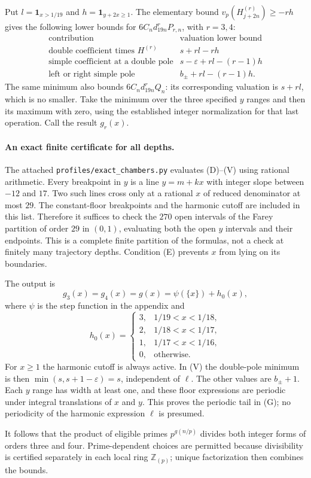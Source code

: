 Put $l=\mathbf1_{x>1/19}$ and $h=\mathbf1_{y+2x\ge1}$. The elementary
bound $v_p(H_{j+2n}^{(r)})\ge-rh$ gives the following lower bounds for
$6C_nd_{19n}^{r}P_{r,n}$, with $r=3,4$:
\[
 \begin{array}{c|c}
 \text{contribution}&\text{valuation lower bound}\\\hline
 \text{double coefficient times }H^{(r)}&s+rl-rh\\
 \text{simple coefficient at a double pole}&s-\varepsilon+rl-(r-1)h\\
 \text{left or right simple pole}&b_\pm+rl-(r-1)h.
 \end{array}
 \tag{V}
\]
The same minimum also bounds $6C_nd_{19n}^rQ_n$: its corresponding
valuation is $s+rl$, which is no smaller. Take the minimum over the three
specified $y$ ranges and then its maximum with zero, using the established
integer normalization for that last operation. Call the result $g_r(x)$.

\paragraph{An exact finite certificate for all depths.}
The attached \texttt{profiles/exact\_chambers.py} evaluates (D)--(V)
using rational arithmetic. Every breakpoint in $y$ is a line $y=m+kx$
with integer slope between $-12$ and $17$. Two such lines cross only at
a rational $x$ of reduced denominator at most $29$. The constant-floor
breakpoints and the harmonic cutoff are included in this list. Therefore
it suffices to check the $270$ open intervals of the Farey partition of
order $29$ in $(0,1)$, evaluating both the open $y$ intervals and their
endpoints. This is a complete finite partition of the formulas, not a
check at finitely many trajectory depths. Condition (E) prevents $x$ from
lying on its boundaries.

The output is
\[
 g_3(x)=g_4(x)=g(x)=\psi(\{x\})+h_0(x),
 \tag{G}
\]
where $\psi$ is the step function in the appendix and
\[
 h_0(x)=
 \begin{cases}
 3,&1/19<x<1/18,\\
 2,&1/18<x<1/17,\\
 1,&1/17<x<1/16,\\
 0,&\text{otherwise}.
 \end{cases}
\]
For $x\ge1$ the harmonic cutoff is always active. In (V) the double-pole
minimum is then $\min(s,s+1-\varepsilon)=s$, independent of $\ell$.
The other values are $b_\pm+1$. Each $y$ range has width at least one, and
these floor expressions are periodic under integral translations of $x$
and $y$. This proves the periodic tail in (G); no periodicity of the
harmonic expression $\ell$ is presumed.

It follows that the product of eligible primes $p^{g(n/p)}$ divides both
integer forms of orders three and four. Prime-dependent choices are
permitted because divisibility is certified separately in each local
ring $\mathbb Z_{(p)}$; unique factorization then combines the bounds.
